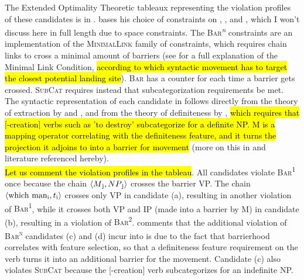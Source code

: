 The Extended Optimality Theoretic tableaux representing the violation profiles of these candidates is in . \textcite{keller1997extraction} bases his choice of constraints on \textcite{diesing1992indefinites}, \textcite{legendre1995optimality}, and \textcite{legendre1998less}, which I won't discuss here in full length due to space constraints. The \textsc{Bar}\textsuperscript{\textit{n}} constraints are an implementation of the \textsc{MinimalLink} family of constraints, which requires chain links to cross a minimal amount of barriers (see \textcite{chomsky1993minimalist} for a full explanation of the Minimal Link Condition, \hl{according to which syntactic movement has to target the closest potential landing site}). \textsc{Bar} has a counter for each time a barrier gets crossed. \textsc{SubCat} requires instead that subcategorization requirements be met. The syntactic representation of each candidate in  follows directly from the theory of extraction by \textcite{legendre1995optimality} and \textcite{legendre1998less}, and from the theory of definiteness by \textcite{diesing1992indefinites}, \hl{which requires that [-creation] verbs such as 'to destroy' subcategorize for a definite NP. M is a mapping operator correlating with the definiteness feature, and it turns the projection it adjoins to into a barrier for movement} (more on this in \textcite[11]{keller1997extraction} and literature referenced hereby).\\
\hl{Let us comment the violation profiles in the tableau}. All candidates violate \textsc{Bar\textsuperscript{1}} once because the chain $\langle M\textsubscript{j}, NP\textsubscript{j} \rangle$ crosses the barrier VP. The chain $\langle \text{which man}\textsubscript{i}, t\textsubscript{i} \rangle$ crosses only VP in candidate (a), resulting in another violation of \textsc{Bar\textsuperscript{1}}, while it crosses both VP and IP (made into a barrier by M) in candidate (b), resulting in a violation of \textsc{Bar\textsuperscript{2}}. \textcite{keller1997extraction} comments that the additional violation of \textsc{Bar\textsuperscript{n}} candidates (c) and (d) incur into is due to the fact that barrierhood correlates with feature selection, so that a definiteness feature requirement on the verb turns it into an additional barrier for the movement. Candidate (c) also violates \textsc{SubCat} because the [-creation] verb subcategorizes for an indefinite NP.

